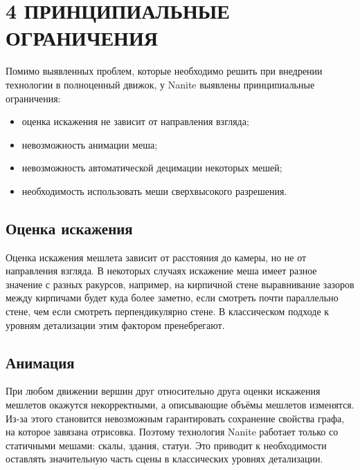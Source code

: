 \clearpage
\section{4 ПРИНЦИПИАЛЬНЫЕ ОГРАНИЧЕНИЯ}
Помимо выявленных проблем, которые необходимо решить при внедрении технологии в полноценный движок, у Nanite выявлены принципиальные ограничения:
\begin{itemize}
    \item оценка искажения не зависит от направления взгляда;
    \item невозможность анимации меша;
    \item невозможность автоматической децимации некоторых мешей;
    \item необходимость использовать меши сверхвысокого разрешения.
\end{itemize}

\subsection*{Оценка искажения}
Оценка искажения мешлета зависит от расстояния до камеры, но не от направления взгляда.
В некоторых случаях искажение меша имеет разное значение с разных ракурсов, например, на кирпичной стене выравнивание зазоров между кирпичами будет куда более заметно, если смотреть почти параллельно стене, чем если смотреть перпендикулярно стене.
В классическом подходе к уровням детализации этим фактором пренебрегают.

\subsection*{Анимация}
При любом движении вершин друг относительно друга оценки искажения мешлетов окажутся некорректными, а описывающие объёмы мешлетов изменятся.
Из-за этого становится невозможным гарантировать сохранение свойства графа, на которое завязана отрисовка.
Поэтому технология Nanite работает только со статичными мешами: скалы, здания, статуи.
Это приводит к необходимости оставлять значительную часть сцены в классических уровнях детализации.

